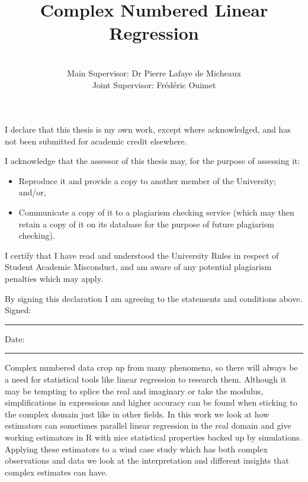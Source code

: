 \documentclass[honours,12pt]{unswthesis}
\title{Complex Numbered Linear Regression}
\author{\Authornameonly\\{\bigskip}Main Supervisor: Dr Pierre Lafaye de Micheaux \\ Joint Supervisor: Frédéric Ouimet}
\newcommand\blankpage{%
    \null
    \thispagestyle{empty}%
    \addtocounter{page}{-1}%
    \newpage}
\numberwithin{equation}{section}
\begin{document}
\beforepreface

\afterpage{\blankpage}



\vskip 10pc \noindent I declare that this thesis is my
own work, except where acknowledged, and has not been submitted for
academic credit elsewhere. 

\vskip 2pc  \noindent I acknowledge that the assessor of this
thesis may, for the purpose of assessing it:
\begin{itemize}
\item Reproduce it and provide a copy to another member of the University; and/or,
\item Communicate a copy of it to a plagiarism checking service (which may then retain a copy of it on its database for the purpose of future plagiarism checking).
\end{itemize}

\vskip 2pc \noindent I certify that I have read and understood the University Rules in
respect of Student Academic Misconduct, and am aware of any potential plagiarism penalties which may 
apply.\vspace{24pt}

\vskip 2pc \noindent By signing 
this declaration I am
agreeing to the statements and conditions above.
\vskip 2pc \noindent
Signed: \rule{7cm}{0.25pt} \hfill Date: \rule{4cm}{0.25pt} \newline
\vskip 1pc

\afterpage{\blankpage}



Complex numbered data crop up from many phenomena, so there will always be a need for statistical tools like linear regression to research them. Although it may be tempting to splice the real and imaginary or take the modulus, simplifications in expressions and higher accuracy can be found when sticking to the complex domain just like in other fields. In this work we look at how estimators can sometimes parallel linear regression in the real domain and give working estimators in R with nice statistical properties backed up by simulations. Applying these estimators to a wind case study which has both complex observations and data we look at the interpretation and different insights that complex estimates can have.

\end{document}
